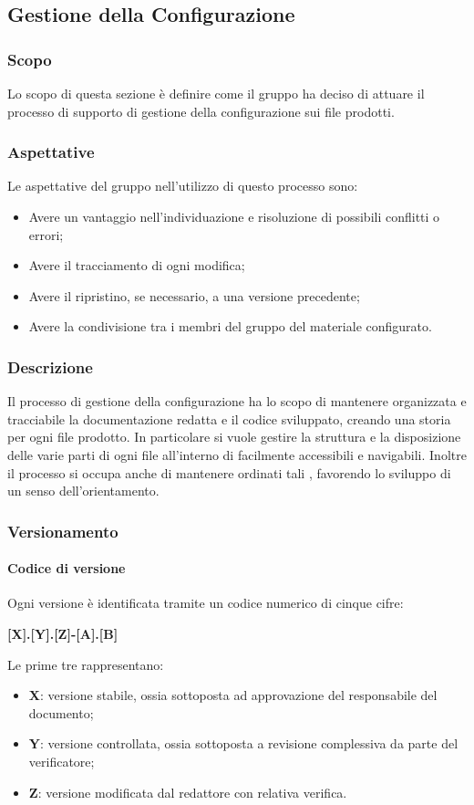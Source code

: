 \subsection{Gestione della Configurazione}
\subsubsection{Scopo}
Lo scopo di questa sezione è definire come il gruppo ha deciso di attuare il processo di supporto di gestione della configurazione sui file prodotti.

\subsubsection{Aspettative}
Le aspettative del gruppo \Gruppo{} nell'utilizzo di questo processo sono:
\begin{itemize}
	\item Avere un vantaggio nell'individuazione e risoluzione di possibili conflitti o errori;
	\item Avere il tracciamento di ogni modifica;
	\item Avere il ripristino, se necessario, a una versione precedente;
	\item Avere la condivisione tra i membri del gruppo del materiale configurato.
\end{itemize}

\subsubsection{Descrizione}
Il processo di gestione della configurazione ha lo scopo di mantenere organizzata e tracciabile la documentazione redatta e il codice sviluppato, creando una storia per ogni file prodotto. In particolare si vuole gestire la struttura e la disposizione delle varie parti di ogni file all'interno di  facilmente accessibili e navigabili.
Inoltre il processo si occupa anche di mantenere ordinati tali , favorendo lo sviluppo di un senso dell'orientamento.

\subsubsection{Versionamento}
\paragraph{Codice di versione}
Ogni versione è identificata tramite un codice numerico di cinque cifre:
\begin{center}
\textbf{[X].[Y].[Z]-[A].[B]} 
\end{center}
Le prime tre rappresentano:
\begin{itemize}
	\item \textbf{X}: versione stabile, ossia sottoposta ad approvazione del responsabile del documento;
  	\item \textbf{Y}: versione controllata, ossia sottoposta a revisione complessiva da parte del verificatore;
  	\item \textbf{Z}: versione modificata dal redattore con relativa verifica.
\end{itemize}
  
